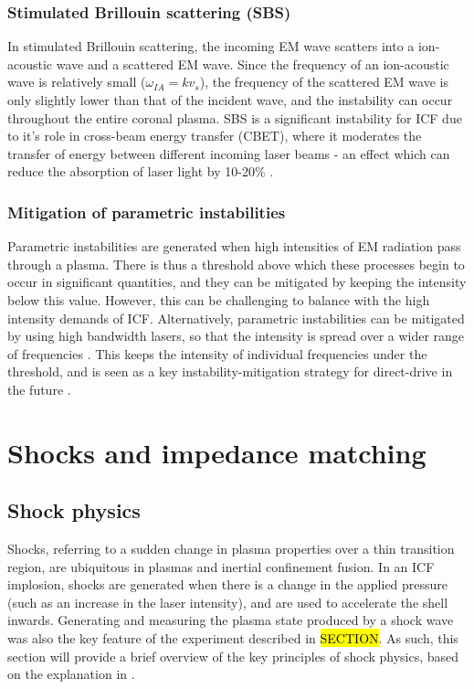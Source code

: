 \subsubsection{Stimulated Brillouin scattering (SBS)}
In stimulated Brillouin scattering, the incoming EM wave scatters into a ion-acoustic wave and a scattered EM wave. Since the frequency of an ion-acoustic wave is relatively small ($\omega_{IA} = kv_s$), the frequency of the scattered EM wave is only slightly lower than that of the incident wave, and the instability can occur throughout the entire coronal plasma. SBS is a significant instability for ICF due to it's role in cross-beam energy transfer (CBET), where it moderates the transfer of energy between different incoming laser beams - an effect which can reduce the absorption of laser light by 10-20\% \cite{Igumenshchev2012}.

\subsubsection{Mitigation of parametric instabilities}
Parametric instabilities are generated when high intensities of EM radiation pass through a plasma. There is thus a threshold above which these processes begin to occur in significant quantities, and they can be mitigated by keeping the intensity below this value. However, this can be challenging to balance with the high intensity demands of ICF. Alternatively, parametric instabilities can be mitigated by using high bandwidth lasers, so that the intensity is spread over a wider range of frequencies \cite{Follett2018}. This keeps the intensity of individual frequencies under the threshold, and is seen as a key instability-mitigation strategy for direct-drive in the future \cite{Campbell2021a}.


\section{Shocks and impedance matching}

\subsection{Shock physics}

Shocks, referring to a sudden change in plasma properties over a thin transition region, are ubiquitous in plasmas and inertial confinement fusion. In an ICF implosion, shocks are generated when there is a change in the applied pressure (such as an increase in the laser intensity), and are used to accelerate the shell inwards. Generating and measuring the plasma state produced by a shock wave was also the key feature of the experiment described in \hl{SECTION}. As such, this section will provide a brief overview of the key principles of shock physics, based on the explanation in \cite{Zeldovich1966}.

